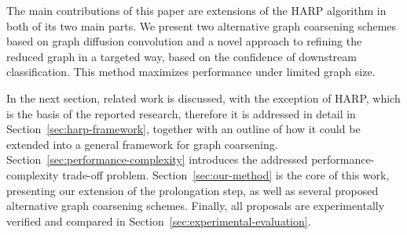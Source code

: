 The main contributions of this paper are extensions of the HARP algorithm in both of its two main parts. We present two alternative graph coarsening schemes based on graph diffusion convolution and a novel approach to refining the reduced graph in a targeted way, based on the confidence of downstream classification. This method maximizes performance under limited graph size.

In the next section, related work is discussed, with the exception of HARP, which is the basis of the reported research, therefore it is addressed in detail in Section~\ref{sec:harp-framework}, together with an outline of how it could be extended into a general framework for graph coarsening. Section~\ref{sec:performance-complexity} introduces the addressed performance-complexity trade-off problem. Section~\ref{sec:our-method} is the core of this work, presenting our extension of the prolongation step, as well as several proposed alternative graph coarsening schemes. Finally, all proposals are experimentally verified and compared in Section~\ref{sec:experimental-evaluation}.
